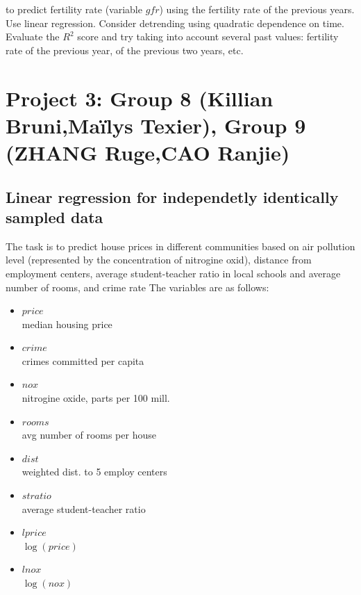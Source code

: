 \documentclass{article}
\begin{document}
   to predict fertility rate (variable $gfr$)
    using the fertility rate of the previous years. 
    Use linear regression. Consider detrending using quadratic dependence on time.  
   Evaluate the $R^2$ score and try taking into account several past values: fertility rate of the previous year, of the previous two years, etc. 



\section*{Project 3: Group 8 (Killian Bruni,Maïlys Texier), Group 9 (ZHANG Ruge,CAO Ranjie) }
 \subsection*{Linear regression for independetly identically sampled data}
    The task is to predict house prices in different communities based on air pollution level (represented by the concentration of nitrogine oxid), 
distance from employment centers, average student-teacher ratio 
 in local schools and average number of rooms, and crime rate The variables are as follows:
    \begin{itemize}
    \item{$price$ \\}       
	median housing price
    \item{$crime$ \\}                    
		crimes committed per capita
    \item{$nox$ \\}                      
	nitrogine oxide, parts per 100 mill.
    \item{$rooms$ \\}                    
    avg number of rooms per house
    \item{$dist$ \\}                     
      weighted dist. to 5 employ centers
    \item{$stratio$ \\}                  average student-teacher ratio
    \item{$lprice$ \\}                   $\log(price)$
    \item{$lnox$ \\}                     $\log(nox)$
   \end{itemize}
\end{document}
